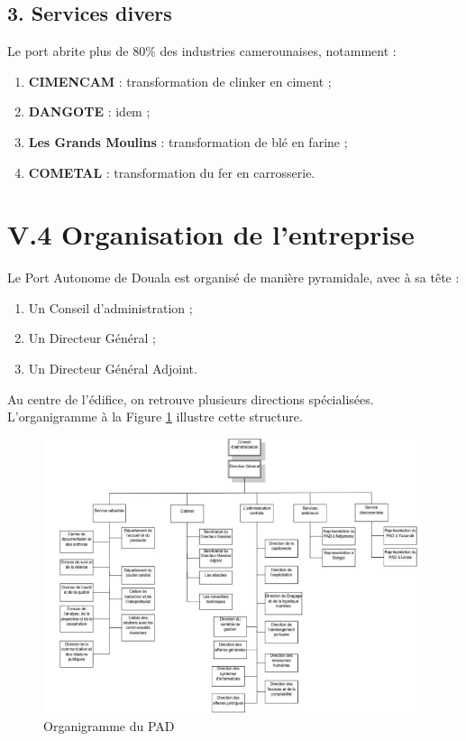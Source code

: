 \documentclass[a4paper,12pt,openany]{report}
\begin{document}
	\subsection*{3. Services divers}
	
	Le port abrite plus de 80\% des industries camerounaises, notamment :
	\begin{enumerate}
		\item \textbf{CIMENCAM} : transformation de clinker en ciment ;
		\item \textbf{DANGOTE} : idem ;
		\item \textbf{Les Grands Moulins} : transformation de blé en farine ;
		\item \textbf{COMETAL} : transformation du fer en carrosserie.
	\end{enumerate}
	
	\section*{V.4 Organisation de l’entreprise }
	
	Le Port Autonome de Douala est organisé de manière pyramidale, avec à sa tête :
	\begin{enumerate}
		\item Un Conseil d’administration ;
		\item Un Directeur Général ;
		\item Un Directeur Général Adjoint.
	\end{enumerate}
	
	Au centre de l’édifice, on retrouve plusieurs directions spécialisées. L'organigramme à la Figure \ref{Fig 2} illustre cette structure.
	
	\begin{figure}[h]
		\centering
		\includegraphics[width=0.99\textwidth]{images/orgramigrame_pad.png}
		\caption{Organigramme du PAD \label{Fig 2}}
	\end{figure}
	
\end{document}
